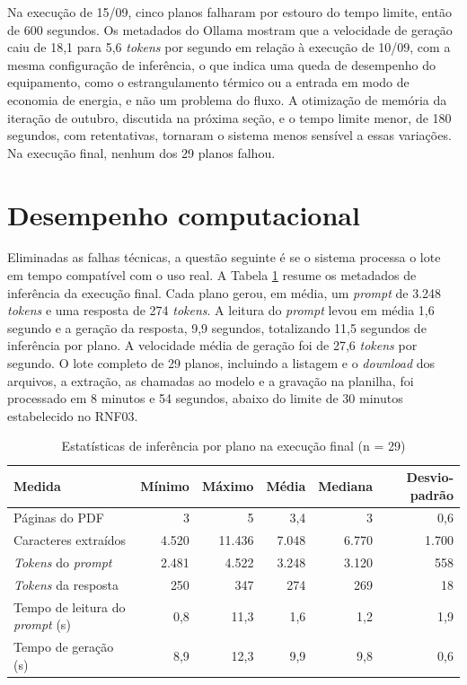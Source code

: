 Na execução de 15/09, cinco planos falharam por estouro do tempo limite, então de 600 segundos. Os metadados do Ollama mostram que a velocidade de geração caiu de 18,1 para 5,6 \textit{tokens} por segundo em relação à execução de 10/09, com a mesma configuração de inferência, o que indica uma queda de desempenho do equipamento, como o estrangulamento térmico ou a entrada em modo de economia de energia, e não um problema do fluxo. A otimização de memória da iteração de outubro, discutida na próxima seção, e o tempo limite menor, de 180 segundos, com retentativas, tornaram o sistema menos sensível a essas variações. Na execução final, nenhum dos 29 planos falhou.

\section{Desempenho computacional}
\label{sec:res-desempenho}

Eliminadas as falhas técnicas, a questão seguinte é se o sistema processa o lote em tempo compatível com o uso real. A Tabela \ref{tab:desempenho} resume os metadados de inferência da execução final. Cada plano gerou, em média, um \textit{prompt} de 3.248 \textit{tokens} e uma resposta de 274 \textit{tokens}. A leitura do \textit{prompt} levou em média 1,6 segundo e a geração da resposta, 9,9 segundos, totalizando 11,5 segundos de inferência por plano. A velocidade média de geração foi de 27,6 \textit{tokens} por segundo. O lote completo de 29 planos, incluindo a listagem e o \textit{download} dos arquivos, a extração, as chamadas ao modelo e a gravação na planilha, foi processado em 8 minutos e 54 segundos, abaixo do limite de 30 minutos estabelecido no RNF03.

\begin{table}[H]
\centering
\caption{Estatísticas de inferência por plano na execução final (n = 29)}
\label{tab:desempenho}
\footnotesize
\begin{tabular}{@{}lrrrrr@{}}
\toprule
\rowcolor[HTML]{EFEFEF}
\textbf{Medida} & \textbf{Mínimo} & \textbf{Máximo} & \textbf{Média} & \textbf{Mediana} & \textbf{Desvio-padrão} \\ \midrule
Páginas do PDF & 3 & 5 & 3,4 & 3 & 0,6 \\
Caracteres extraídos & 4.520 & 11.436 & 7.048 & 6.770 & 1.700 \\
\textit{Tokens} do \textit{prompt} & 2.481 & 4.522 & 3.248 & 3.120 & 558 \\
\textit{Tokens} da resposta & 250 & 347 & 274 & 269 & 18 \\
Tempo de leitura do \textit{prompt} (s) & 0,8 & 11,3 & 1,6 & 1,2 & 1,9 \\
Tempo de geração (s) & 8,9 & 12,3 & 9,9 & 9,8 & 0,6 \\ \bottomrule
\end{tabular}
\end{table}

